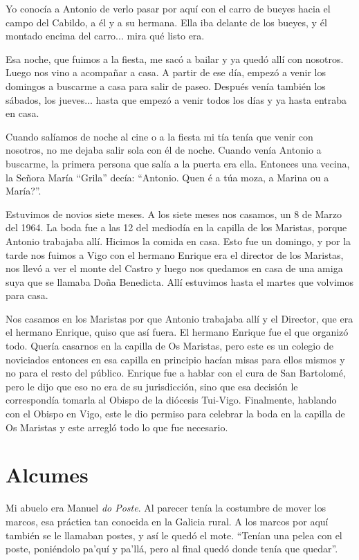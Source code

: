 \documentclass[12pt,a5paper]{book}
\begin{document}
Yo conocía a Antonio de verlo pasar por aquí con el carro de bueyes hacia el campo del Cabildo, a él y a su hermana. Ella iba delante de los bueyes, y él montado encima del carro... mira qué listo era.

Esa noche, que fuimos a la fiesta, me sacó a bailar y ya quedó allí con nosotros. Luego nos vino a acompañar a casa. A partir de ese día, empezó a venir los domingos a buscarme a casa para salir de paseo. Después venía también los sábados, los jueves... hasta que empezó a venir todos los días y ya hasta entraba en casa.

Cuando salíamos de noche al cine o a la fiesta mi tía tenía que venir con nosotros, no me dejaba salir sola con él de noche. Cuando venía Antonio a buscarme, la primera persona que salía a la puerta era ella. Entonces una vecina, la Señora María ``Grila'' decía: ``Antonio. Quen é a túa moza, a Marina ou a María?''.

Estuvimos de novios siete meses. A los siete meses nos casamos, un 8 de Marzo del 1964. La boda fue a las 12 del mediodía en la capilla de los Maristas, porque Antonio trabajaba allí. Hicimos la comida en casa. Esto fue un domingo, y por la tarde nos fuimos a Vigo con el hermano Enrique era el director de los Maristas, nos llevó a ver el monte del Castro y luego nos quedamos en casa de una amiga suya que se llamaba Doña Benedicta. Allí estuvimos hasta el martes que volvimos para casa. 

Nos casamos en los Maristas por que Antonio trabajaba allí y el Director, que era el hermano Enrique, quiso que así fuera. El hermano Enrique fue el que organizó todo. Quería casarnos en la capilla de Os Maristas, pero este es un colegio de noviciados entonces en esa capilla en principio hacían misas para ellos mismos y no para el resto del público. Enrique fue a hablar con el cura de San Bartolomé, pero le dijo que eso no era de su jurisdicción, sino que esa decisión le correspondía tomarla al Obispo de la diócesis Tui-Vigo. Finalmente, hablando con el Obispo en Vigo, este le dio permiso para celebrar la boda en la capilla de Os Maristas y este arregló todo lo que fue necesario.


\section*{Alcumes}


Mi abuelo era Manuel \textit{do Poste}. Al parecer tenía la costumbre de mover los marcos, esa práctica tan conocida en la Galicia rural. A los marcos por aquí también se le llamaban postes, y así le quedó el mote. ``Tenían una pelea con el poste, poniéndolo pa'quí y pa'llá, pero al final quedó donde tenía que quedar''.
\end{document}
